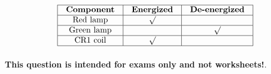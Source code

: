 






$$\vbox{\offinterlineskip
\halign{\strut
\vrule \quad\hfil # \ \hfil & 
\vrule \quad\hfil # \ \hfil & 
\vrule \quad\hfil # \ \hfil \vrule \cr
\noalign{\hrule}
%
{\bf Component} & {\bf Energized} & {\bf De-energized} \cr
%
\noalign{\hrule}
%
Red lamp & $\surd$ &  \cr
%
\noalign{\hrule}
%
Green lamp &  & $\surd$ \cr
%
\noalign{\hrule}
%
CR1 coil & $\surd$ &  \cr
%
\noalign{\hrule}
} %
}$$ %








{\bf This question is intended for exams only and not worksheets!}.


